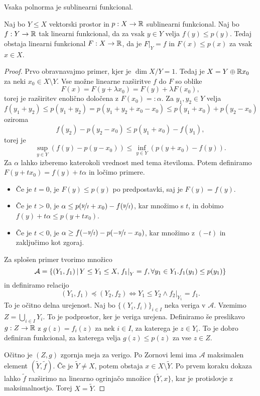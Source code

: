 \begin{primer}
  Vsaka polnorma je sublinearni funkcional.
\end{primer}

\begin{izrek}
  Naj bo $Y \le X$ vektorski prostor in $p: X \to \mathbb{R}$ sublinearni funkcional.
  Naj bo $f: Y \to \mathbb{R}$ tak linearni funkcional, da za vsak $y \in Y$ velja $f(y)
  \le p(y)$.
  Tedaj obstaja linearni funkcional $F: X \to \mathbb{R}$, da je $\left. F \right|_Y =
  f$ in $F(x) \le p(x)$ za vsak $x \in X$.
\end{izrek}

\begin{proof}
  Prvo obravnavajmo primer, kjer je $\dim X/Y = 1$.
  Tedaj je $X = Y \oplus \mathbb{R} x_0$ za neki $x_0 \in X \setminus Y$.
  Vse možne linearne razširitve $f$ do $F$ so oblike
  \[
	F(x) = F(y + \lambda x_0) = F(y) + \lambda F(x_0),
  \]
  torej je razširitev enolično določena z $F(x_0) =: \alpha$.
  Za $y_1, y_2 \in Y$ velja
  \[
	f(y_1 + y_2) \le p(y_1 + y_2) = p(y_1 + y_2 + x_0 - x_0)
	\le p(y_1 + x_0) + p(y_2 - x_0)
  \]
  oziroma
  \[
	f(y_2) - p(y_2 - x_0) \le p(y_1 + x_0) - f(y_1),
  \]
  torej je
  \[
	\sup_{y \in Y} \left( f(y) - p(y - x_0) \right)
	\le \inf_{y \in Y} \left( p(y + x_0) - f(y) \right).
  \]
  Za $\alpha$ lahko izberemo katerokoli vrednost med tema številoma.
  Potem definiramo $F(y + t x_0) = f(y) + t \alpha$ in ločimo primere.
  \begin{itemize}
  \item Če je $t = 0$, je $F(y) \le p(y)$ po predpostavki, saj je $F(y) = f(y)$.
  \item Če je $t > 0$, je $\alpha \le p(\nicefrac{y}{t} + x_0) -
	f(\nicefrac{y}{t})$, kar množimo s $t$, in dobimo $f(y) + t \alpha \le p(y +
	t x_0)$.
  \item Če je $t < 0$, je $\alpha \ge f(-\nicefrac{y}{t}) - p(-\nicefrac{y}{t} -
	x_0)$, kar množimo z $(-t)$ in zaključimo kot zgoraj.
  \end{itemize}

  Za splošen primer tvorimo množico
  \[
	\mathcal{A} = \{
	(Y_1, f_1) \,|\, Y \le Y_1 \le X, \left. f_1 \right|_Y = f,
	\forall y_1 \in Y_1 . f_1(y_1) \le p(y_1)
	\}
  \]
  in definiramo relacijo
  \[
	(Y_1, f_1) \preccurlyeq (Y_2, f_2) \iff Y_1 \le Y_2 \land \left. f_2
	\right|_{Y_1} = f_1.
  \]
  To je očitno delna urejenost.
  Naj bo $\{(Y_i, f_i)\}_{i \in I}$ neka veriga v $\mathcal{A}$.
  Vzemimo $Z = \bigcup_{i \in I} Y_i$.
  To je podprostor, ker je veriga urejena.
  Definiramo še preslikavo $g: Z \to \mathbb{R}$ z $g(z) = f_i(z)$ za nek $i \in I$, za
  katerega je $z \in Y_i$.
  To je dobro definiran funkcional, za katerega velja $g(z) \le p(z)$ za vse $z
  \in Z$.

  Očitno je $(Z, g)$ zgornja meja za verigo.
  Po Zornovi lemi ima $\mathcal{A}$ maksimalen element $(\tilde{Y}, \tilde{f})$.
  Če je $\tilde{Y} \ne X$, potem obstaja $x \in X \setminus \tilde{Y}$.
  Po prvem koraku dokaza lahko $\tilde{f}$ razširimo na linearno ogrinjačo
  množice $\{\tilde{Y}, x\}$, kar je protislovje z maksimalnostjo.
  Torej $X = \tilde{Y}$.
\end{proof}

